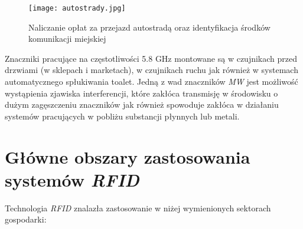 \begin{itemize}
	\begin{figure}[h!]
	\centering
	    \texttt{[image: autostrady.jpg]}
	    \caption{Naliczanie opłat za przejazd autostradą oraz identyfikacja środków komunikacji miejskiej}
	\end{figure}

	Znaczniki pracujące na częstotliwości 5.8 GHz montowane są w czujnikach przed drzwiami (w sklepach i marketach), w czujnikach ruchu jak również w systemach automatycznego spłukiwania toalet.
	Jedną z wad znaczników \emph{MW} jest możliwość wystąpienia zjawiska interferencji, które zakłóca  transmisję w środowisku o dużym zagęszczeniu znaczników jak również spowoduje zakłóca w działaniu systemów pracujących  w pobliżu substancji płynnych lub metali.

\end{itemize}

\newpage

\section{Główne obszary zastosowania systemów \emph{RFID}}

\noindent 
Technologia \emph{RFID} znalazła zastosowanie w niżej wymienionych sektorach gospodarki: 

